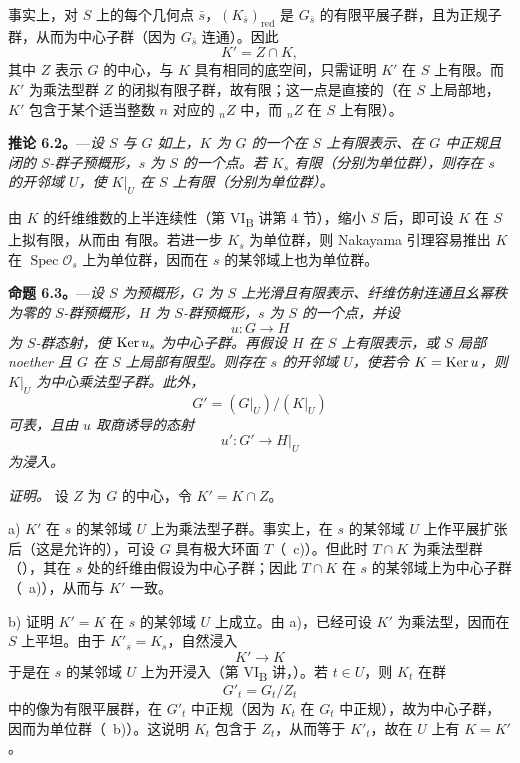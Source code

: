 \medskip
事实上，对 \(S\) 上的每个几何点 \(\bar s\)，\((K_{\bar s})_{\mathrm{red}}\) 是 \(G_{\bar s}\) 的有限平展子群，且为正规子群，从而为中心子群（因为 \(G_{\bar s}\) 连通）。因此
\[
  K'=Z\cap K,
\]
其中 \(Z\) 表示 \(G\) 的中心，与 \(K\) 具有相同的底空间，只需证明 \(K'\) 在 \(S\) 上有限。而 \(K'\) 为乘法型群 \(Z\) 的闭拟有限子群，故有限；这一点是直接的（在 \(S\) 上局部地，\(K'\) 包含于某个适当整数 \(n\) 对应的 \({}_nZ\) 中，而 \({}_nZ\) 在 \(S\) 上有限）。

\medskip
\noindent{}%
\textbf{推论 6.2。}---\textit{设 \(S\) 与 \(G\) 如上，\(K\) 为 \(G\) 的一个在 \(S\) 上有限表示、在 \(G\) 中正规且闭的 \(S\)-群子预概形，\(s\) 为 \(S\) 的一个点。若 \(K_s\) 有限（分别为单位群），则存在 \(s\) 的开邻域 \(U\)，使 \(K|_U\) 在 \(S\) 上有限（分别为单位群）。}

\medskip
由 \(K\) 的纤维维数的上半连续性（第 VI\textsubscript{B} 讲第 4 节），缩小 \(S\) 后，即可设 \(K\) 在 \(S\) 上拟有限，从而由  有限。若进一步 \(K_s\) 为单位群，则 Nakayama 引理容易推出 \(K\) 在 \(\operatorname{Spec}\mathcal O_s\) 上为单位群，因而在 \(s\) 的某邻域上也为单位群。

\medskip
\noindent{}%
\textbf{命题 6.3。}---\textit{设 \(S\) 为预概形，\(G\) 为 \(S\) 上光滑且有限表示、纤维仿射连通且幺幂秩为零的 \(S\)-群预概形，\(H\) 为 \(S\)-群预概形，\(s\) 为 \(S\) 的一个点，并设}
\[
  u:G\longrightarrow H
\]
\textit{为 \(S\)-群态射，使 \(\operatorname{Ker} u_s\) 为中心子群。再假设 \(H\) 在 \(S\) 上有限表示，或 \(S\) 局部 noether 且 \(G\) 在 \(S\) 上局部有限型。则存在 \(s\) 的开邻域 \(U\)，使若令 \(K=\operatorname{Ker} u\)，则 \(K|_U\) 为中心乘法型子群。此外，}
\[
  G'=(G|_U)/(K|_U)
\]
\textit{可表，且由 \(u\) 取商诱导的态射}
\[
  u':G'\longrightarrow H|_U
\]
\textit{为浸入。}

\medskip
\noindent\textit{证明。}
设 \(Z\) 为 \(G\) 的中心，令 \(K'=K\cap Z\)。

\medskip
\noindent a) \(K'\) 在 \(s\) 的某邻域 \(U\) 上为乘法型子群。事实上，在 \(s\) 的某邻域 \(U\) 上作平展扩张后（这是允许的），可设 \(G\) 具有极大环面 \(T\)（~c)）。但此时 \(T\cap K\) 为乘法型群（），其在 \(s\) 处的纤维由假设为中心子群；因此 \(T\cap K\) 在 \(s\) 的某邻域上为中心子群（~a)），从而与 \(K'\) 一致。

\medskip
\noindent b) 证明 \(K'=K\) 在 \(s\) 的某邻域 \(U\) 上成立。由 a)，已经可设 \(K'\) 为乘法型，因而在 \(S\) 上平坦。由于 \(K'_s=K_s\)，自然浸入
\[
  K'\longrightarrow K
\]
于是在 \(s\) 的某邻域 \(U\) 上为开浸入（第 VI\textsubscript{B} 讲，）。若 \(t\in U\)，则 \(K_t\) 在群
\[
  G'_t=G_t/Z_t
\]
中的像为有限平展群，在 \(G'_t\) 中正规（因为 \(K_t\) 在 \(G_t\) 中正规），故为中心子群，因而为单位群（~b)）。这说明 \(K_t\) 包含于 \(Z_t\)，从而等于 \(K'_t\)，故在 \(U\) 上有 \(K=K'\)。

